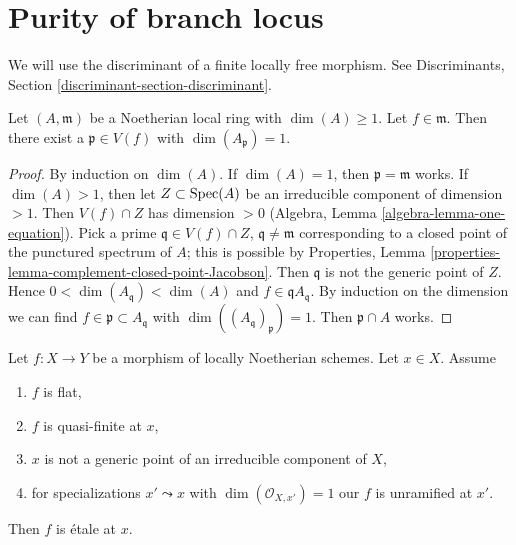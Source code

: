 \section{Purity of branch locus}
\label{section-purity}

\noindent
We will use the discriminant of a finite locally free morphism. See
Discriminants, Section \ref{discriminant-section-discriminant}.

\begin{lemma}
\label{lemma-find-point-codim-1}
Let $(A, \mathfrak m)$ be a Noetherian local ring with $\dim(A) \geq 1$.
Let $f \in \mathfrak m$. Then there exist a $\mathfrak p \in V(f)$ with
$\dim(A_\mathfrak p) = 1$.
\end{lemma}

\begin{proof}
By induction on $\dim(A)$. If $\dim(A) = 1$, then $\mathfrak p = \mathfrak m$
works. If $\dim(A) > 1$, then let $Z \subset \mathop{\mathrm{Spec}}(A)$ be an irreducible
component of dimension $> 1$. Then $V(f) \cap Z$ has dimension $> 0$
(Algebra, Lemma \ref{algebra-lemma-one-equation}). Pick a prime
$\mathfrak q \in V(f) \cap Z$, $\mathfrak q \not = \mathfrak m$
corresponding to a closed point of the punctured spectrum of $A$;
this is possible by
Properties, Lemma \ref{properties-lemma-complement-closed-point-Jacobson}.
Then $\mathfrak q$ is not the generic point of $Z$. Hence
$0 < \dim(A_\mathfrak q) < \dim(A)$ and $f \in \mathfrak q A_\mathfrak q$.
By induction on the dimension we can find
$f \in \mathfrak p \subset A_\mathfrak q$ with
$\dim((A_\mathfrak q)_\mathfrak p) = 1$.
Then $\mathfrak p \cap A$ works.
\end{proof}

\begin{lemma}
\label{lemma-ramification-quasi-finite-flat}
Let $f : X \to Y$ be a morphism of locally Noetherian schemes.
Let $x \in X$. Assume
\begin{enumerate}
\item $f$ is flat,
\item $f$ is quasi-finite at $x$,
\item $x$ is not a generic point of an irreducible component of $X$,
\item for specializations $x' \leadsto x$ with
$\dim(\mathcal{O}_{X, x'}) = 1$ our $f$ is unramified at $x'$.
\end{enumerate}
Then $f$ is \'etale at $x$.
\end{lemma}

